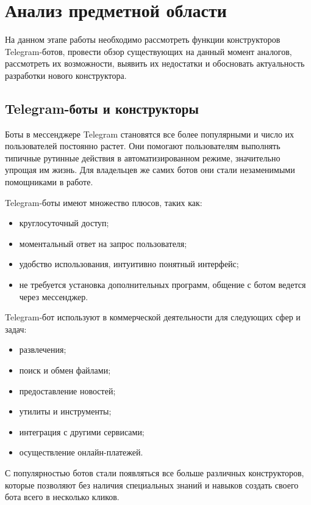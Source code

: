
\section{Анализ предметной области}


На данном этапе работы необходимо рассмотреть функции
конструкторов Telegram-ботов,
провести обзор существующих на данный момент аналогов, рассмотреть их возможности,
выявить их
недостатки и обосновать актуальность разработки нового конструктора.

\subsection{Telegram-боты и конструкторы}

Боты в мессенджере Telegram становятся все более популярными и
число их пользователей постоянно растет. Они помогают пользователям
выполнять типичные рутинные действия в автоматизированном режиме,
значительно упрощая им жизнь. Для владельцев же самих ботов они стали
незаменимыми помощниками в работе.

Telegram-боты имеют множество плюсов, таких как:
\begin{itemize}
	\item круглосуточный доступ;
	\item моментальный ответ на запрос пользователя;
	\item удобство использования, интуитивно понятный интерфейс;
	\item не требуется установка дополнительных программ,
	      общение с ботом ведется через мессенджер.
\end{itemize}

Telegram-бот используют в коммерческой деятельности для следующих сфер и задач:
\begin{itemize}
	\item развлечения;
	\item поиск и обмен файлами;
	\item предоставление новостей;
	\item утилиты и инструменты;
	\item интеграция с другими сервисами;
	\item осуществление онлайн-платежей.
\end{itemize}


С популярностью ботов стали появляться все больше различных
конструкторов, которые позволяют
без наличия специальных знаний и
навыков создать своего бота всего в несколько кликов.

